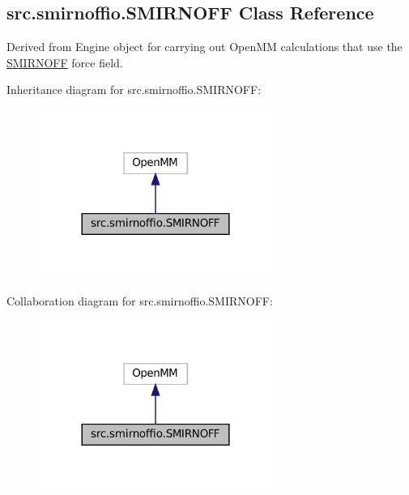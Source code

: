\hypertarget{classsrc_1_1smirnoffio_1_1SMIRNOFF}{}\subsection{src.\+smirnoffio.\+S\+M\+I\+R\+N\+O\+FF Class Reference}
\label{classsrc_1_1smirnoffio_1_1SMIRNOFF}


Derived from Engine object for carrying out Open\+MM calculations that use the \hyperlink{classsrc_1_1smirnoffio_1_1SMIRNOFF}{S\+M\+I\+R\+N\+O\+FF} force field.  




Inheritance diagram for src.\+smirnoffio.\+S\+M\+I\+R\+N\+O\+FF\+:
\nopagebreak
\begin{figure}[H]
\begin{center}
\leavevmode
\includegraphics[width=216pt]{classsrc_1_1smirnoffio_1_1SMIRNOFF__inherit__graph}
\end{center}
\end{figure}


Collaboration diagram for src.\+smirnoffio.\+S\+M\+I\+R\+N\+O\+FF\+:
\nopagebreak
\begin{figure}[H]
\begin{center}
\leavevmode
\includegraphics[width=216pt]{classsrc_1_1smirnoffio_1_1SMIRNOFF__coll__graph}
\end{center}
\end{figure}
